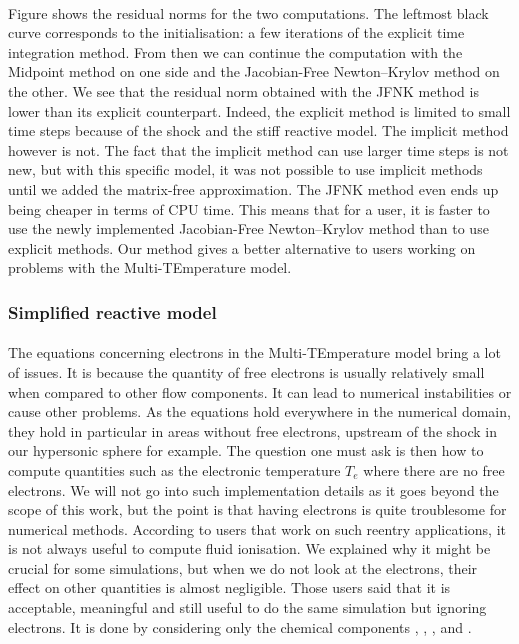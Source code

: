         \paragraph{}
        Figure  shows the residual norms for the two computations.
        The leftmost black curve corresponds to the initialisation: a few iterations of the explicit time integration method.
        From then we can continue the computation with the Midpoint method on one side and the Jacobian-Free Newton--Krylov method on the other.
        We see that the residual norm obtained with the JFNK method is lower than its explicit counterpart.
        Indeed, the explicit method is limited to small time steps because of the shock and the stiff reactive model.
        The implicit method however is not.
        The fact that the implicit method can use larger time steps is not new, but with this specific model, it was not possible to use implicit methods until we added the matrix-free approximation.
        The JFNK method even ends up being cheaper in terms of CPU time.
        This means that for a user, it is faster to use the newly implemented Jacobian-Free Newton--Krylov method than to use explicit methods.
        Our method gives a better alternative to users working on problems with the Multi-TEmperature model.


      \subsubsection{Simplified reactive model}

        \paragraph{}
        The equations concerning electrons in the Multi-TEmperature model bring a lot of issues.
        It is because the quantity of free electrons is usually relatively small when compared to other flow components.
        It can lead to numerical instabilities or cause other problems.
        As the equations hold everywhere in the numerical domain, they hold in particular in areas without free electrons, upstream of the shock in our hypersonic sphere for example.
        The question one must ask is then how to compute quantities such as the electronic temperature $T_e$ where there are no free electrons.
        We will not go into such implementation details as it goes beyond the scope of this work, but the point is that having electrons is quite troublesome for numerical methods.
        According to users that work on such reentry applications, it is not always useful to compute fluid ionisation.
        We explained why it might be crucial for some simulations, but when we do not look at the electrons, their effect on other quantities is almost negligible.
        Those users said that  it is acceptable, meaningful and still useful to do the same simulation but ignoring electrons.
        It is done by considering only the chemical components , , ,  and .

